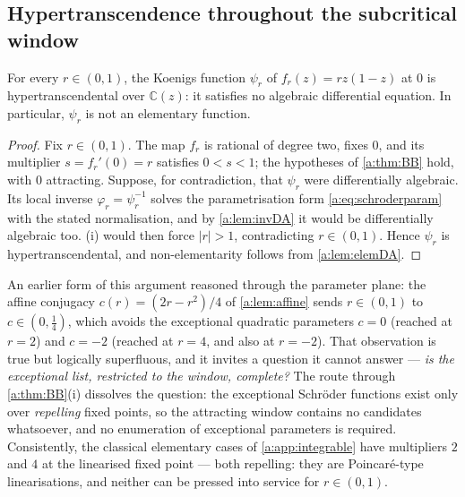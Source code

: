 \subsection{Hypertranscendence throughout the subcritical window}
\label{a:sec:mainht}

\begin{theorem}
\label{a:thm:mainht}
For every $r\in(0,1)$, the Koenigs function $\psi_r$ of $f_r(z)=rz(1-z)$ at $0$
is hypertranscendental over $\mathbb{C}(z)$: it satisfies no algebraic
differential equation. In particular, $\psi_r$ is not an elementary function.
\end{theorem}

\begin{proof}
Fix $r\in(0,1)$. The map $f_r$ is rational of degree two, fixes $0$, and its
multiplier $s=f_r'(0)=r$ satisfies $0<s<1$; the hypotheses of \cref{a:thm:BB}
hold, with $0$ attracting. Suppose, for contradiction, that $\psi_r$ were
differentially algebraic. Its local inverse $\varphi_r=\psi_r^{-1}$ solves the
parametrisation form \cref{a:eq:schroderparam} with the stated normalisation, and
by \cref{a:lem:invDA} it would be differentially algebraic too.
(i) would then force $|r|>1$, contradicting $r\in(0,1)$. Hence
$\psi_r$ is hypertranscendental, and non-elementarity follows from
\cref{a:lem:elemDA}.
\end{proof}

\begin{remark}
\label{a:rem:empty}
An earlier form of this argument reasoned through the parameter plane: the affine
conjugacy $c(r)=(2r-r^{2})/4$ of \cref{a:lem:affine} sends $r\in(0,1)$ to
$c\in(0,\tfrac14)$, which avoids the exceptional quadratic parameters $c=0$
(reached at $r=2$) and $c=-2$ (reached at $r=4$, and also at $r=-2$). That
observation is true but logically superfluous, and it invites a question it cannot
answer --- \emph{is the exceptional list, restricted to the window, complete?} The
route through \cref{a:thm:BB}(i) dissolves the question: the exceptional
Schr\"oder functions exist only over \emph{repelling} fixed points, so the
attracting window contains no candidates whatsoever, and no enumeration of
exceptional parameters is required. Consistently, the classical elementary cases
of \cref{a:app:integrable} have multipliers $2$ and $4$ at the linearised fixed
point --- both repelling: they are Poincar\'e-type linearisations, and neither can
be pressed into service for $r\in(0,1)$.
\end{remark}

